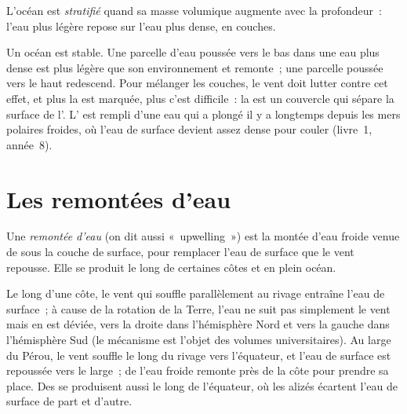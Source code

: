 \begin{definition}[Stratification]\label{def:g10:layered-ocean:stratification}
L'océan est \emph{stratifié} quand sa masse volumique
augmente avec la profondeur~: l'eau plus légère repose sur l'eau plus dense,
en couches.
\end{definition}

Un océan  est stable. Une parcelle d'eau poussée vers le bas dans
une eau plus dense est plus légère que son environnement et remonte~; une
parcelle poussée vers le haut redescend. Pour mélanger les couches, le vent
doit lutter contre cet effet, et plus la  est marquée, plus c'est
difficile~: la  est un couvercle qui sépare la surface de
l'. L' est rempli d'une eau qui a plongé il y a
longtemps depuis les mers polaires froides, où l'eau de surface devient
assez dense pour couler (livre~1, année~8).

\section{Les remontées d'eau}

\begin{definition}\label{def:g10:layered-ocean:upwelling}
Une \emph{remontée d'eau} (on dit aussi
«~upwelling~») est la montée d'eau froide venue de sous la couche de
surface, pour remplacer l'eau de surface que le vent repousse. Elle se
produit le long de certaines côtes et en plein océan.
\end{definition}

Le long d'une côte, le vent qui souffle parallèlement au rivage entraîne
l'eau de surface~; à cause de la rotation de la Terre, l'eau ne suit pas
simplement le vent mais en est déviée, vers la droite dans l'hémisphère Nord
et vers la gauche dans l'hémisphère Sud (le mécanisme est l'objet des
volumes universitaires). Au large du Pérou, le vent souffle le long du
rivage vers l'équateur, et l'eau de surface est repoussée vers le large~;
de l'eau froide remonte près de la côte pour prendre sa place. Des  se produisent aussi le long de l'équateur, où les alizés écartent
l'eau de surface de part et d'autre.

